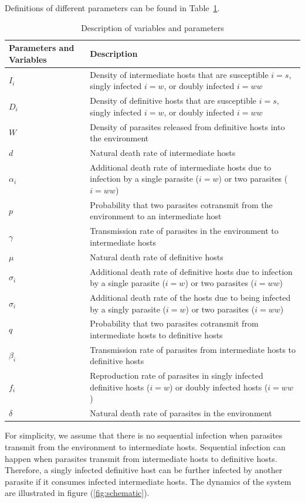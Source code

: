 \documentclass[11pt]{article}
\begin{document}
Definitions of different parameters can be found in Table~\ref{table:varpardescription}.
%
\begin{table}[!ht]
\begin{tabular}{|p{2.5cm}|p{12cm}|} 
\hline
Parameters and Variables    &  Description  \\
\hline
$I_i$  & Density of intermediate hosts that are susceptible $i=s$, singly infected $i=w$, or doubly infected $i=ww$ \\
\hline
$D_i$ & Density of definitive hosts that are susceptible $i=s$, singly infected $i=w$, or doubly infected $i=ww$ \\
\hline
$W$ & Density of parasites released from definitive hosts into the environment \\
\hline
$d$ & Natural death rate of intermediate hosts \\
\hline
$\alpha_i$ & Additional death rate of intermediate hosts due to infection by a single parasite ($i = w$) or two parasites ($i = ww$) \\
\hline
$p$ & Probability that two parasites cotransmit from the environment to an intermediate host \\
\hline
$\gamma$ & Transmission rate of parasites in the environment to intermediate hosts \\
\hline
$\mu$ & Natural death rate of definitive hosts \\
\hline
$\sigma_i$ & Additional death rate of definitive hosts due to infection by a single parasite ($i = w$) or two parasites ($i = ww$) \\
\hline
$\sigma_i$ & Additional death rate of the hosts due to being infected by a singly parasite ($i = w$) or two parasites ($i = ww$) \\
\hline
$q$ & Probability that two parasites cotransmit from intermediate hosts to definitive hosts \\
\hline
$\beta_i$ & Transmission rate of parasites from intermediate hosts to definitive hosts \\
\hline
$f_i$ & Reproduction rate of parasites in singly infected definitive hosts ($i = w$) or doubly infected hosts ($i = ww$)\\
\hline
$\delta$ & Natural death rate of parasites in the environment \\
\hline
\end{tabular}
\caption{Description of variables and parameters}
\label{table:varpardescription}
\end{table}

For simplicity, we assume that there is no sequential infection when parasites transmit from the environment to intermediate hosts. 
Sequential infection can happen when parasites transmit from intermediate hosts to definitive hosts. 
Therefore, a singly infected definitive host can be further infected by another parasite if it consumes infected intermediate hosts. 
The dynamics of the system are illustrated in figure (\ref{fig:schematic}).
\end{document}

